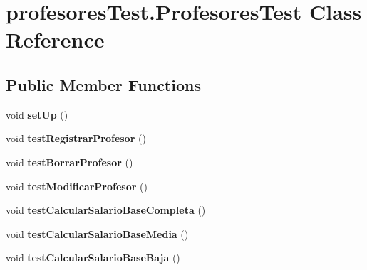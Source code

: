 \hypertarget{classprofesores_test_1_1_profesores_test}{}\section{profesores\+Test.\+Profesores\+Test Class Reference}
\label{classprofesores_test_1_1_profesores_test}
\subsection*{Public Member Functions}
\begin{DoxyCompactItemize}
\item 
\mbox{\label{classprofesores_test_1_1_profesores_test_a71799b7af15adb515b2f2fa70b27c273}} 
void {\bfseries set\+Up} ()
\item 
\mbox{\label{classprofesores_test_1_1_profesores_test_ae5fecb82ddd1555732c8bcfb0cece88e}} 
void {\bfseries test\+Registrar\+Profesor} ()
\item 
\mbox{\label{classprofesores_test_1_1_profesores_test_a2a420e15bde77eae7b31c55596cea45c}} 
void {\bfseries test\+Borrar\+Profesor} ()
\item 
\mbox{\label{classprofesores_test_1_1_profesores_test_a20add2bcd010f47b0e6b47c2e3f8bd15}} 
void {\bfseries test\+Modificar\+Profesor} ()
\item 
\mbox{\label{classprofesores_test_1_1_profesores_test_a92e0403de0d02040d9f6682ec64cb179}} 
void {\bfseries test\+Calcular\+Salario\+Base\+Completa} ()
\item 
\mbox{\label{classprofesores_test_1_1_profesores_test_a357a20d975b752bfe6846c693e7f0853}} 
void {\bfseries test\+Calcular\+Salario\+Base\+Media} ()
\item 
\mbox{\label{classprofesores_test_1_1_profesores_test_a8b2abb0ab47e50856a7f83d92b2b10f0}} 
void {\bfseries test\+Calcular\+Salario\+Base\+Baja} ()
\item 

\end{DoxyCompactItemize}
